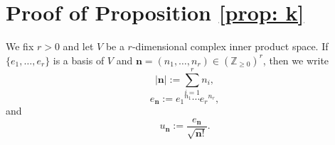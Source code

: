 \documentclass{amsart}
\theoremstyle{definition}
\theoremstyle{remark}
\numberwithin{equation}{section}
\begin{document}
\newpage

\appendix




\section{Proof of Proposition \ref{prop: k}}


We fix $r > 0$ and let $V$ be a $r$-dimensional complex inner product space. If $\{e_1, \dotsc, e_r\}$ is a basis of $V$ and $\mathbf{n}=(n_1, \dotsc, n_r) \in (\mathbb{Z}_{\geq0})^r$, then we write 
$$
|\mathbf{n}| := \sum_{i=1}^r n_i,
$$
$$
e_\mathbf{n} := {e_1}^{n_1} \dotsb {e_r}^{n_r},
$$
and
$$
u_{\mathbf{n}} := \frac{e_\mathbf{n}}{\sqrt{\mathbf{n}!}}.
$$



 
\end{document}
